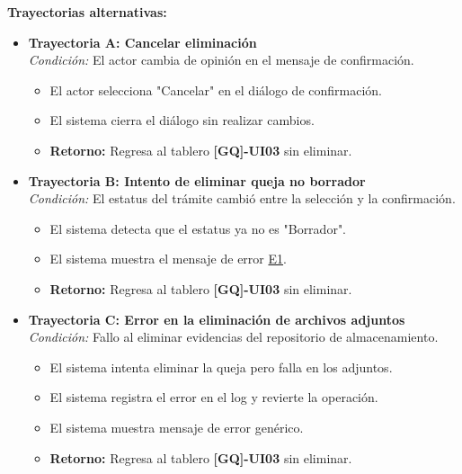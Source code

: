 \begin{appendices}
\textbf{Trayectorias alternativas:}
\begin{itemize}[leftmargin=*]
    \item \textbf{Trayectoria A: Cancelar eliminación} \\
    \textit{Condición:} El actor cambia de opinión en el mensaje de confirmación.
    \begin{itemize}[nosep]
        \item[A-1:] El actor selecciona "Cancelar" en el diálogo de confirmación.
        \item[A-2:] El sistema cierra el diálogo sin realizar cambios.
        \item \textbf{Retorno:} Regresa al tablero \textbf{[GQ]-UI03} sin eliminar.
    \end{itemize}
    \item \textbf{Trayectoria B: Intento de eliminar queja no borrador} \\
    \textit{Condición:} El estatus del trámite cambió entre la selección y la confirmación.
    \begin{itemize}[nosep]
        \item[B-1:] El sistema detecta que el estatus ya no es "Borrador".
        \item[B-2:] El sistema muestra el mensaje de error \hyperlink{err:E15}{E1}.
        \item \textbf{Retorno:} Regresa al tablero \textbf{[GQ]-UI03} sin eliminar.
    \end{itemize}
    \item \textbf{Trayectoria C: Error en la eliminación de archivos adjuntos} \\
    \textit{Condición:} Fallo al eliminar evidencias del repositorio de almacenamiento.
    \begin{itemize}[nosep]
        \item[C-1:] El sistema intenta eliminar la queja pero falla en los adjuntos.
        \item[C-2:] El sistema registra el error en el log y revierte la operación.
        \item[C-3:] El sistema muestra mensaje de error genérico.
        \item \textbf{Retorno:} Regresa al tablero \textbf{[GQ]-UI03} sin eliminar.
    \end{itemize}
\end{itemize}

\newpage


\end{appendices}
